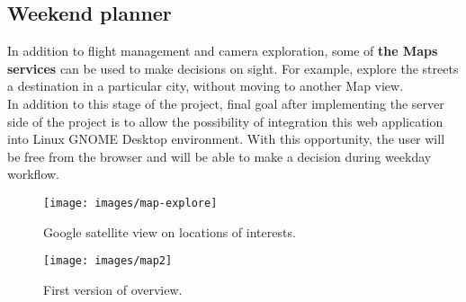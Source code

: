 \documentclass[12pt]{article}
\numberwithin{equation}{section} %
\numberwithin{figure}{section} %
\numberwithin{table}{section} %
\begin{document}
	\subsection{Weekend planner}
	In addition to flight management and camera exploration, some of \textbf{the Maps services} can be used to make decisions on sight. For example, explore the streets a destination in a particular city, without moving to another Map view. \\
	In addition to this stage of the project, final goal after implementing the server side of the project is to allow the possibility of integration this web application into Linux GNOME Desktop environment. With this opportunity, the user will be free from the browser and will be able to make a decision during weekday workflow.
	\begin{figure}[H]
		\centering        
		\texttt{[image: images/map-explore]}
		\caption{Google satellite view on locations of interests.}
		\label{fig:map-satel}
	\end{figure}
	
	\begin{figure}[H]
		\centering        
		\texttt{[image: images/map2]}
		\caption{First version of overview.}
		\label{fig:map2}
	\end{figure}
		
\newpage
\end{document}
